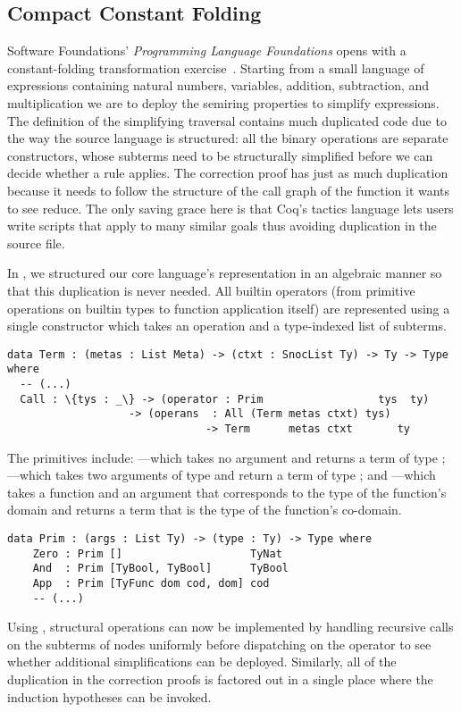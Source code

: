 \subsection{Compact Constant Folding}
\label{sec:design:constants}

Software Foundations' \emph{Programming Language Foundations} opens with a constant-folding transformation exercise~\cite[Chapter~1]{Pierce:SF2}.
%
Starting from a small language of expressions containing natural numbers, variables, addition, subtraction, and multiplication we are to deploy the semiring properties to simplify expressions.
%
The definition of the simplifying traversal contains much duplicated code due to the way the source language is structured:
%
all the binary operations are separate constructors, whose subterms need to be structurally simplified before we can decide whether a rule applies.
%
The correction proof has just as much duplication because it needs to follow the structure of the call graph of the function it wants to see reduce.
%
The only saving grace here is that Coq's tactics language lets users write scripts that apply to many similar goals thus avoiding duplication in the source file.

In \Velo{}, we structured our core language's representation in an algebraic
manner so that this duplication is never needed.
%
All builtin operators (from primitive operations on builtin types to function
application itself) are represented using a single  constructor
which takes an operation and a type-indexed list of subterms.

\begin{Verbatim}
data Term : (metas : List Meta) -> (ctxt : SnocList Ty) -> Ty -> Type where
  -- (...)
  Call : \{tys : _\} -> (operator : Prim                  tys  ty)
                   -> (operans  : All (Term metas ctxt) tys)
                               -> Term      metas ctxt       ty
\end{Verbatim}

The primitives include:
%
---which takes no argument and returns a term of type ;
%
---which takes two arguments of type  and return a term
of type ;
%
and
%
---which takes a function and an argument that corresponds to the type of the function's domain and returns a term that is the type of the function's co-domain.

\begin{Verbatim}
data Prim : (args : List Ty) -> (type : Ty) -> Type where
    Zero : Prim []                    TyNat
    And  : Prim [TyBool, TyBool]      TyBool
    App  : Prim [TyFunc dom cod, dom] cod
    -- (...)
\end{Verbatim}

Using , structural operations can now be implemented by handling recursive calls on the subterms of  nodes uniformly before dispatching on the operator to see whether additional simplifications can be deployed.
%
Similarly, all of the duplication in the correction proofs is factored out in a single place where the induction hypotheses can be invoked.

